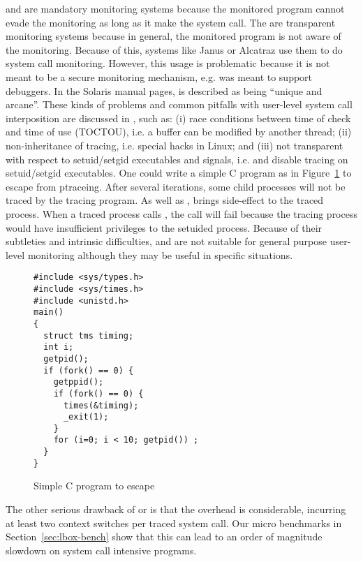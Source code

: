  and  are mandatory monitoring
systems because the monitored program cannot evade the monitoring as long
as it make the system call.
The are transparent monitoring systems because in general,
the monitored program is not aware of the monitoring.
Because of this,
systems like Janus \cite{wagner1999janus} or
Alcatraz \cite{liang2009alcatraz} use them to do system call monitoring.
However, this usage is problematic because it is not
meant to be a secure monitoring mechanism, e.g.
 was meant to support debuggers.
In the Solaris manual pages,  is described as being
``unique and arcane''.
These kinds of problems and common
pitfalls with user-level system call interposition
are discussed in \cite{garfinkel2003traps}, such as:
(i) race conditions between time of check and time of use (TOCTOU), 
i.e. a buffer can be modified by another thread;
(ii) non-inheritance of tracing, i.e. special  hacks in Linux;
and (iii) not transparent with respect to setuid/setgid executables 
and signals,
i.e.  and  disable tracing 
on setuid/setgid executables.  
One could write a simple C program as in Figure~\ref{fig:ptrace-bug}
to escape from ptraceing.
After several iterations, some
child processes will not be traced by the tracing program.
As well as , 
brings side-effect to the traced process.
When a traced process calls ,
the call will fail because the tracing process would have insufficient
privileges to the setuided process.
Because of their subtleties and intrinsic difficulties,
 and  are not suitable for general purpose user-level
monitoring although they may be useful in specific situations.

\begin{figure}[htb]
\begin{verbatim}
#include <sys/types.h>
#include <sys/times.h>
#include <unistd.h>
main()
{
  struct tms timing;
  int i;
  getpid();
  if (fork() == 0) {
    getppid();
    if (fork() == 0) {
      times(&timing);
      _exit(1);
    }
    for (i=0; i < 10; getpid()) ;
  }
}
\end{verbatim}
\caption{Simple C program to escape }
\label{fig:ptrace-bug}
\end{figure}

The other serious drawback of  or  is that
the overhead is considerable, incurring at least two
context switches per traced system call.
Our micro benchmarks in Section~\ref{sec:lbox-bench} show that
this can lead to an order of magnitude
slowdown on system call intensive programs.

